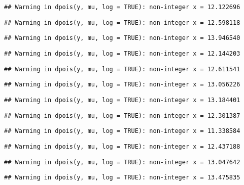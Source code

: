 \documentclass[
]{article}
\begin{document}
\begin{verbatim}
## Warning in dpois(y, mu, log = TRUE): non-integer x = 12.122696
\end{verbatim}

\begin{verbatim}
## Warning in dpois(y, mu, log = TRUE): non-integer x = 12.598118
\end{verbatim}

\begin{verbatim}
## Warning in dpois(y, mu, log = TRUE): non-integer x = 13.946540
\end{verbatim}

\begin{verbatim}
## Warning in dpois(y, mu, log = TRUE): non-integer x = 12.144203
\end{verbatim}

\begin{verbatim}
## Warning in dpois(y, mu, log = TRUE): non-integer x = 12.611541
\end{verbatim}

\begin{verbatim}
## Warning in dpois(y, mu, log = TRUE): non-integer x = 13.056226
\end{verbatim}

\begin{verbatim}
## Warning in dpois(y, mu, log = TRUE): non-integer x = 13.184401
\end{verbatim}

\begin{verbatim}
## Warning in dpois(y, mu, log = TRUE): non-integer x = 12.301387
\end{verbatim}

\begin{verbatim}
## Warning in dpois(y, mu, log = TRUE): non-integer x = 11.338584
\end{verbatim}

\begin{verbatim}
## Warning in dpois(y, mu, log = TRUE): non-integer x = 12.437188
\end{verbatim}

\begin{verbatim}
## Warning in dpois(y, mu, log = TRUE): non-integer x = 13.047642
\end{verbatim}

\begin{verbatim}
## Warning in dpois(y, mu, log = TRUE): non-integer x = 13.475835
\end{verbatim}
\end{document}
